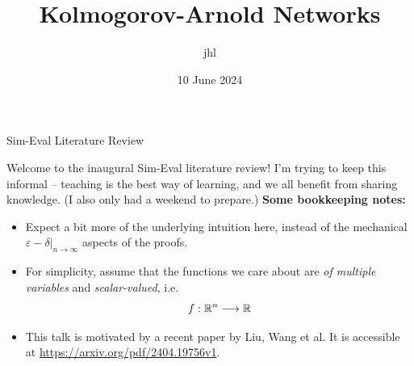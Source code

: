 




\title{Kolmogorov-Arnold Networks}
\author{jhl}
\date{10 June 2024}



{
\begin{frame}{}
    {\center Sim-Eval Literature Review}
    \titlepage
\end{frame}
}

\addtocounter{framenumber}{-1}

\begin{frame}{Welcome to the inaugural Sim-Eval literature review!} 
    I'm trying to keep this informal -- teaching is the best way of learning,
    and we all benefit from sharing knowledge. (I also only had a weekend to prepare.) 
    \textbf{Some bookkeeping notes:}
    \begin{itemize}
        \item Expect a bit more of the underlying intuition here, instead of the mechanical
            $\varepsilon-\delta|_{n \to \infty}$ aspects of the proofs.
        \item For simplicity, assume that the functions we care about are
            \textit{of multiple variables} and \textit{scalar-valued}, i.e. 
            \[
                f: \mathbb{R}^n \longrightarrow \mathbb{R}
            \]
        \item This talk is motivated by a recent paper by Liu, Wang et al. It is accessible
         at \url{https://arxiv.org/pdf/2404.19756v1}.
    \end{itemize}
\end{frame}

